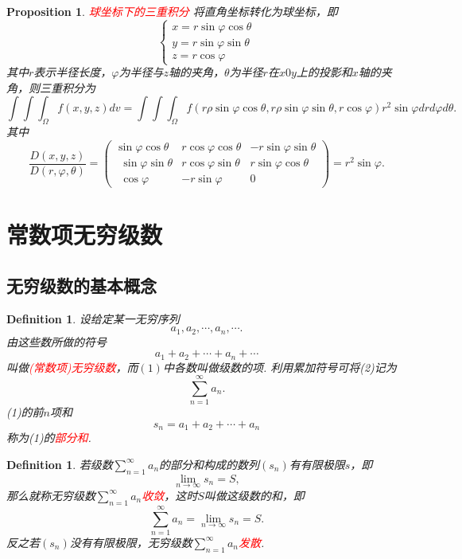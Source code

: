 \documentclass{article}
\newtheorem{proposition}[theorem]{Proposition}
\newtheorem{definition}[theorem]{Definition}
\newcommand{\redt}[1]{\textcolor{red}{#1}}
\begin{document}
\begin{proposition}
\rm \redt{球坐标下的三重积分} 将直角坐标转化为球坐标，即
$$
\left\{
\begin{array}{ll}
x = r\sin\varphi\cos\theta \\
y = r\sin\varphi\sin\theta \\
z = r\cos\varphi
\end{array}\right.
$$
其中$r$表示半径长度，$\varphi$为半径与$z$轴的夹角，$\theta$为半径$r$在$x0y$上的投影和$x$轴的夹角，则三重积分为
$$
\int\int\int_{\Omega}f(x,y,z)dv = \int\int\int_{\Omega} f(r\rho\sin\varphi\cos\theta,r\rho\sin\varphi\sin\theta,r\cos\varphi)
r^2\sin\varphi dr d\varphi d\theta.
$$
其中
$$
\frac{D(x,y,z)}{D(r,\varphi,\theta)} =  \begin{pmatrix}\sin \varphi \cos \theta &r\cos \varphi \cos \theta &-r\sin \varphi \sin \theta \\ \:\:\sin \varphi \sin \theta &r\cos \varphi \sin \theta &r\sin \varphi \cos \theta \\ \:\:\cos \varphi &-r\sin \varphi &0\end{pmatrix} = r^2\sin\varphi.
$$
\end{proposition}

\newpage
\section{常数项无穷级数}

\subsection{无穷级数的基本概念}

\begin{definition}
\rm 设给定某一无穷序列
\begin{equation}
a_1,a_2,\cdots,a_n,\cdots.
\end{equation}
由这些数所做的符号
\begin{equation}
a_1 + a_2 + \cdots + a_n + \cdots
\end{equation}
叫做\redt{(常数项)无穷级数}，而$(1)$中各数叫做级数的项. 利用累加符号可将(2)记为
$$
\sum\limits_{n=1}^\infty a_n.
$$
(1)的前$n$项和
$$
s_n = a_1+a_2+\cdots+a_n
$$
称为(1)的\redt{部分和}.
\end{definition}

\begin{definition}
\rm 若级数$\sum\limits_{n=1}^\infty a_n$的部分和构成的数列$(s_n)$有有限极限$s$，即
$$
\lim\limits_{n \to \infty} s_n = S,
$$
那么就称无穷级数$\sum\limits_{n=1}^\infty a_n$\redt{收敛}，这时$S$叫做这级数的和，即
$$
\sum\limits_{n=1}^\infty a_n = \lim\limits_{n \to \infty} s_n = S.
$$
反之若$(s_n)$没有有限极限，无穷级数$\sum\limits_{n=1}^\infty a_n$\redt{发散}.
\end{definition}
\end{document}
